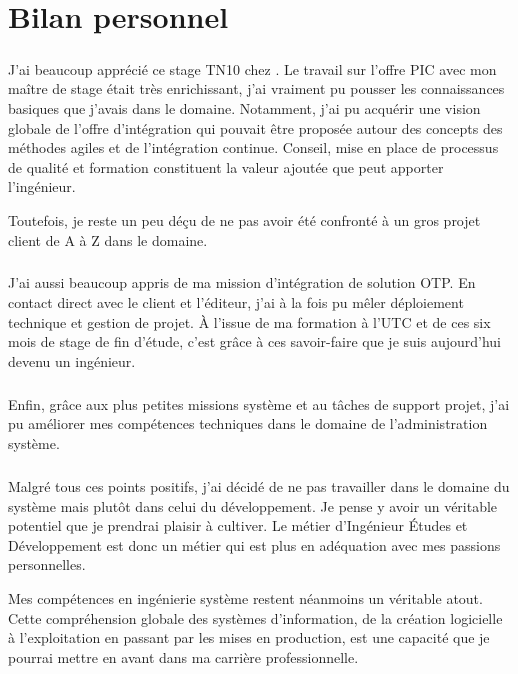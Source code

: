 \chapter{Bilan personnel}

\paragraph{}
J'ai beaucoup apprécié ce stage TN10 chez \asmile.
Le travail sur l'offre PIC avec mon maître de stage \agulet{} était très enrichissant, j'ai vraiment pu pousser les connaissances basiques que j'avais dans le domaine.
Notamment, j'ai pu acquérir une vision globale de l'offre d'intégration qui pouvait être proposée autour des concepts des méthodes agiles et de l'intégration continue.
Conseil, mise en place de processus de qualité et formation constituent la valeur ajoutée que peut apporter l'ingénieur.

Toutefois, je reste un peu déçu de ne pas avoir été confronté à un gros projet client de A à Z dans le domaine.

\paragraph{}
J'ai aussi beaucoup appris de ma mission d'intégration de solution OTP.
En contact direct avec le client et l'éditeur, j'ai à la fois pu mêler déploiement technique et gestion de projet.
À l'issue de ma formation à l'UTC et de ces six mois de stage de fin d'étude, c'est grâce à ces savoir-faire que je suis aujourd'hui devenu un ingénieur. 

\paragraph{}
Enfin, grâce aux plus petites missions système et au tâches de support projet, j'ai pu améliorer mes compétences techniques dans le domaine de l'administration système.

\paragraph{}
Malgré tous ces points positifs, j'ai décidé de ne pas travailler dans le domaine du système mais plutôt dans celui du développement.
Je pense y avoir un véritable potentiel que je prendrai plaisir à cultiver.
Le métier d'Ingénieur Études et Développement est donc un métier qui est plus en adéquation avec mes passions personnelles.

Mes compétences en ingénierie système restent néanmoins un véritable atout.
Cette compréhension globale des systèmes d'information, de la création logicielle à l'exploitation en passant par les mises en production, est une capacité que je pourrai mettre en avant dans ma carrière professionnelle.

